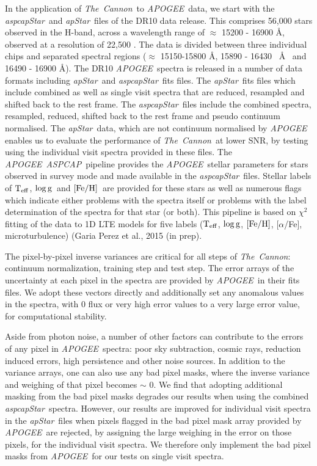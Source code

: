 \documentclass[12pt, preprint]{aastex}
\newcommand{\tc}{\textsl{The~Cannon}}
\newcommand{\apogee}{\textsl{APOGEE}}
\newcommand{\aspcap}{\textsl{ASPCAP}}
\newcommand{\aspcapstar}{\textsl{aspcapStar}}
\newcommand{\apstar}{\textsl{apStar}}
\newcommand{\teff}{\mbox{$\rm T_{eff}$}}
\newcommand{\feh}{\mbox{$\rm [Fe/H]$}}
\newcommand{\logg}{\mbox{$\rm \log g$}}
\begin{document}
In the application of \tc\ to  \apogee\ data, we start with the \aspcapstar\ and \apstar\ files of the DR10 data release. This comprises 56,000 stars observed in the H-band, across a wavelength range of $\approx$ 15200 - 16900 \AA, observed at a resolution of 22,500 \citep{Majewski2012}. The data is divided between three individual chips and separated spectral regions ($\approx$ 15150-15800 \AA, 15890 - 16430~ \AA~ and 16490 - 16900 \AA). The DR10 \apogee\ spectra is released in a number of data formats including \apstar\ and \aspcapstar\ fits files. The \apstar\ fits files which include combined as well as single visit spectra that are reduced, resampled and shifted back to the rest frame. The \aspcapstar\ files include the combined spectra, resampled, reduced, shifted back to the rest frame and pseudo continuum normalised. The \apstar\  data, which are not continuum normalised by \apogee\,  enables us to evaluate the performance of \tc\ at lower SNR, by testing using the individual visit spectra provided in these files. The \apogee\ \aspcap\ pipeline provides the \apogee\ stellar parameters for stars observed in survey mode and made available in the \aspcapstar\ files. Stellar labels of \teff, \logg\ and \feh\ are provided for these stars as well as numerous flags which indicate either problems with the spectra itself or problems with the label determination of the spectra for that star (or both). This pipeline is based on $\chi^2$ fitting of the data to 1D LTE models for five labels (\teff, \logg, \feh, [$\alpha$/Fe], microturbulence) (Garia Perez et al., 2015 (in prep). 

The pixel-by-pixel inverse variances are critical for all steps of \tc: continuum normalization, training step and test step. The error arrays of the uncertainty at each pixel in the spectra are provided by \apogee\ in their fits files. We adopt these vectors directly and additionally set any anomalous values in the spectra, with 0 flux or very high error values to a very large error value, for computational stability.  

Aside from photon noise, a number of other factors can contribute to the errors of any pixel in \apogee\ spectra: poor sky subtraction, cosmic rays, reduction induced errors, high persistence and other noise sources. In addition to the variance arrays, one can also use any bad pixel masks, where the
inverse variance and weighing of that pixel becomes $\sim$ 0. We find that adopting additional masking from the bad pixel masks degrades our results when using the combined \aspcapstar\ spectra. However, our results are improved for individual visit spectra in the \apstar\ files when pixels flagged in the bad pixel mask array provided by \apogee\ are rejected, by assigning the large weighing in the error on those pixels, for the individual visit spectra. We therefore only implement the bad pixel masks from \apogee\ for our tests on single visit spectra. 
\end{document}
